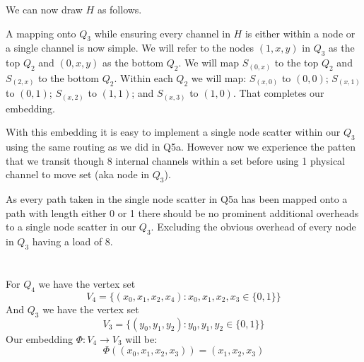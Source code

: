 We can now draw $H$ as follows.
\begin{center}
\end{center}

A mapping onto $Q_3$ while ensuring every channel in $H$ is either within a node or a single channel is now simple.
We will refer to the nodes $(1, x, y)$ in $Q_3$ as the top $Q_2$ and $(0, x, y)$ as the bottom $Q_2$.
We will map $S_{(0, x)}$ to the top $Q_2$ and $S_{(2, x)}$ to the bottom $Q_2$.
Within each $Q_2$ we will map: 
$S_{(x, 0)}$ to $(0,0)$; 
$S_{(x, 1)}$ to $(0,1)$; 
$S_{(x, 2)}$ to $(1,1)$; 
and $S_{(x, 3)}$ to $(1,0)$.
That completes our embedding.

With this embedding it is easy to implement a single node scatter within our $Q_3$ using the same routing as we did in Q5a.
However now we experience the patten that we transit though 8 internal channels within a set before using 1 physical channel to move set (aka node in $Q_3$).

As every path taken in the single node scatter in Q5a has been mapped onto a path with length either 0 or 1 there should be no prominent additional overheads to a single node scatter in our $Q_3$.
Excluding the obvious overhead of every node in $Q_3$ having a load of 8.

\section{}
\subsection{}
For $Q_4$ we have the vertex set
\[
    V_4 = \{(x_0,x_1,x_2, x_4): x_0, x_1, x_2, x_3 \in \{0,1\}\}    
\]
And $Q_3$ we have the vertex set
\[
    V_3 = \{(y_0,y_1,y_2): y_0, y_1, y_2 \in \{0,1\}\}    
\]
Our embedding $\Phi: V_4 \rightarrow V_3$ will be:
\[\Phi((x_0, x_1, x_2, x_3))=(x_1, x_2, x_3)\]

